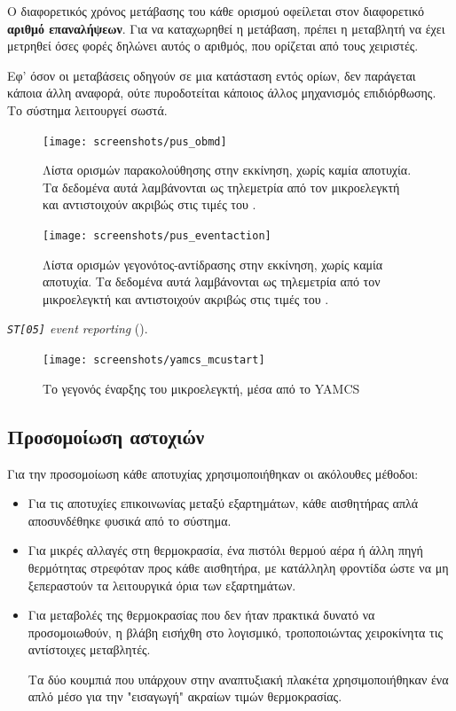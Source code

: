 \documentclass[a4paper,nobib]{tufte-book}
\begin{document}
Ο διαφορετικός χρόνος μετάβασης του κάθε ορισμού οφείλεται στον διαφορετικό \textbf{αριθμό επαναλήψεων}. Για να καταχωρηθεί η μετάβαση, πρέπει η μεταβλητή να έχει μετρηθεί όσες φορές δηλώνει αυτός ο αριθμός, που ορίζεται από τους χειριστές.

Εφ' όσον οι μεταβάσεις οδηγούν σε μια κατάσταση εντός ορίων, δεν παράγεται κάποια άλλη αναφορά, ούτε πυροδοτείται κάποιος άλλος μηχανισμός επιδιόρθωσης. Το σύστημα λειτουργεί σωστά.

\begin{figure}[h]
	\texttt{[image: screenshots/pus\_obmd]}
	\caption[Λίστα ορισμών παρακολούθησης στην εκκίνηση, χωρίς καμία αποτυχία]{Λίστα ορισμών παρακολούθησης στην εκκίνηση, χωρίς καμία αποτυχία. Τα δεδομένα αυτά λαμβάνονται ως τηλεμετρία από τον μικροελεγκτή και αντιστοιχούν ακριβώς στις τιμές του .}
	\label{fig:pus_obmd}
\end{figure}

\begin{figure}[h]
	\texttt{[image: screenshots/pus\_eventaction]}
	\caption[Λίστα ορισμών γεγονότος-αντίδρασης]{Λίστα ορισμών γεγονότος-αντίδρασης στην εκκίνηση, χωρίς καμία αποτυχία. Τα δεδομένα αυτά λαμβάνονται ως τηλεμετρία από τον μικροελεγκτή και αντιστοιχούν ακριβώς στις τιμές του .}
	\label{fig:pus_eventaction}
\end{figure}

 \emph{\texttt{ST[05]} event reporting}  ().

\begin{figure}[h]
	\centering
	\caption{Το γεγονός έναρξης του μικροελεγκτή, μέσα από το \acs{YAMCS}}
	\label{fig:yamcsmcustart}
	\texttt{[image: screenshots/yamcs\_mcustart]}
\end{figure}

\FloatBarrier
\subsection{Προσομοίωση αστοχιών}
\label{sec:simul}

Για την προσομοίωση κάθε αποτυχίας χρησιμοποιήθηκαν οι ακόλουθες μέθοδοι:
\begin{itemize}
	\item Για τις αποτυχίες επικοινωνίας μεταξύ εξαρτημάτων, κάθε αισθητήρας απλά αποσυνδέθηκε φυσικά από το σύστημα.
	\item Για μικρές αλλαγές στη θερμοκρασία, ένα πιστόλι θερμού αέρα ή άλλη πηγή θερμότητας στρεφόταν προς κάθε αισθητήρα, με κατάλληλη φροντίδα ώστε να μη ξεπεραστούν τα λειτουργικά όρια των εξαρτημάτων.
	\item Για μεταβολές της θερμοκρασίας που δεν ήταν πρακτικά δυνατό να προσομοιωθούν, η βλάβη εισήχθη στο λογισμικό, τροποποιώντας χειροκίνητα τις αντίστοιχες μεταβλητές.
	
	Τα δύο κουμπιά που υπάρχουν στην αναπτυξιακή πλακέτα χρησιμοποιήθηκαν ένα απλό μέσο για την "εισαγωγή" ακραίων τιμών θερμοκρασίας.
\end{itemize}
\end{document}
